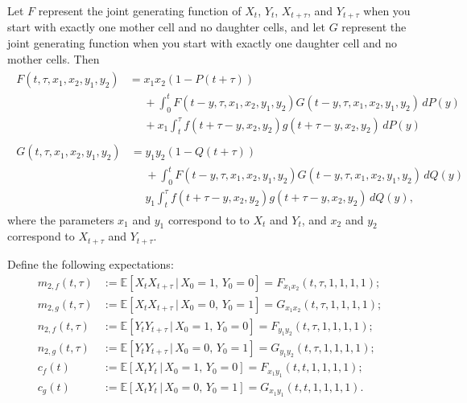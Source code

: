 \documentclass[12pt]{amsart}
\theoremstyle{plain}
\theoremstyle{definition}
\theoremstyle{remark}
\theoremstyle{definition}
\begin{document}
Let $F$ represent the joint generating function of $X_t$, $Y_t$, $X_{t+\tau}$, and $Y_{t+\tau}$ when you start with exactly one mother cell and no daughter cells, and let $G$ represent the joint generating function when you start with exactly one daughter cell and no mother cells. Then
\begin{gather}
\begin{aligned}
F(t,\tau, x_1,x_2,y_1,y_2) &= x_1x_2(1-P(t+\tau)) \\
&\phantom{{}={}} + \int_0^t F(t-y,\tau,x_1,x_2,y_1,y_2)G(t-y,\tau,x_1,x_2,y_1,y_2) \, dP(y) \\
&\phantom{{}={}} + x_1 \int_t^\tau f(t+\tau-y,x_2,y_2)g(t+\tau-y,x_2,y_2) \, dP(y)
\end{aligned} \\
\begin{aligned}
G(t,\tau, x_1,x_2,y_1,y_2) &= y_1y_2(1-Q(t+\tau)) \\
&\phantom{{}={}} + \int_0^t F(t-y,\tau,x_1,x_2,y_1,y_2)G(t-y,\tau,x_1,x_2,y_1,y_2) \, dQ(y) \\
&\phantom{{}={}} y_1 \int_t^\tau f(t+\tau-y,x_2,y_2)g(t+\tau-y,x_2,y_2) \, dQ(y),
\end{aligned}
\end{gather}
where the parameters $x_1$ and $y_1$ correspond to to $X_t$ and $Y_t$, and $x_2$ and $y_2$ correspond to $X_{t+\tau}$ and $Y_{t+\tau}$.

Define the following expectations:
\begin{equation}
\begin{aligned}
m_{2,f}(t,\tau) &:= \mathbb{E}[X_t X_{t+\tau} \, | \, X_0 = 1, \, Y_0 = 0] = F_{x_1 x_2}(t,\tau,1,1,1,1); \\
m_{2,g}(t,\tau) &:= \mathbb{E}[X_t X_{t+\tau} \, | \, X_0 = 0, \, Y_0 = 1] = G_{x_1 x_2}(t,\tau,1,1,1,1); \\
n_{2,f}(t,\tau) &:= \mathbb{E}[Y_t Y_{t+\tau} \, | \, X_0 = 1, \, Y_0 = 0] = F_{y_1 y_2}(t,\tau,1,1,1,1); \\
n_{2,g}(t,\tau) &:= \mathbb{E}[Y_t Y_{t+\tau} \, | \, X_0 = 0, \, Y_0 = 1] = G_{y_1 y_2}(t,\tau,1,1,1,1); \\
c_f(t) &:= \mathbb{E}[X_t Y_t \, | \, X_0 = 1, \, Y_0 = 0] = F_{x_1 y_1}(t,t,1,1,1,1); \\
c_g(t) &:= \mathbb{E}[X_t Y_t \, | \, X_0 = 0, \, Y_0 = 1] = G_{x_1 y_1}(t,t,1,1,1,1).
\end{aligned}
\end{equation}
\end{document}
